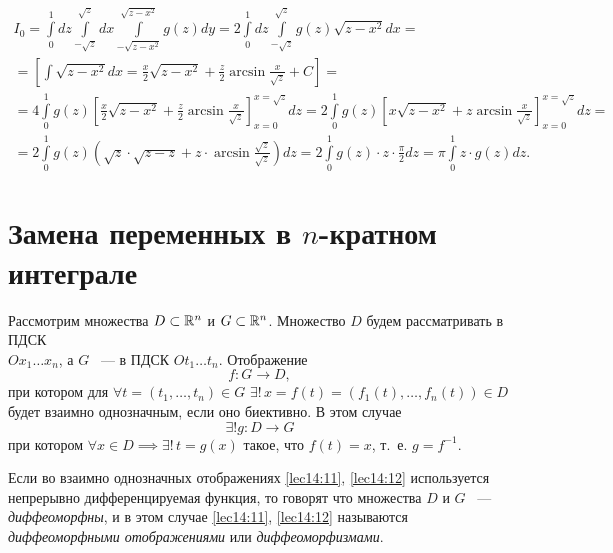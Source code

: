 \documentclass[../../main.tex]{subfiles}
\begin{document}
\begin{example}
		\[
		\begin{gathered}
		I_0 = 
		\int\limits_0^1dz\int\limits_{-\sqrt{z}}^{\sqrt{z}}dx\int\limits_{-\sqrt{z - 
		x^2}}^{\sqrt{z - x^2}}g\left(z\right)dy = 
		2\int\limits_0^1dz\int\limits_{-\sqrt{z}}^{\sqrt{z}}g\left(z\right)\sqrt{z - 
		x^2}dx = \\ =
		\left[\int\sqrt{z - x^2}dx = \frac{x}{2}\sqrt{z - x^2} + 
		\frac{z}{2}\arcsin{\frac{x}{\sqrt{z}}} + C\right] = \\ = 
		4 \int\limits_0^1 g\left(z\right) \left[ \frac{x}{2}\sqrt{z - x^2} + 
		\frac{z}{2}\arcsin{\frac{x}{\sqrt{z}}}\right]_{x=0}^{x=\sqrt{z}}dz= 2 
		\int\limits_0^1 g\left(z\right) \left[x\sqrt{z - x^2} + 
		z\arcsin{\frac{x}{\sqrt{z}}}\right]_{x=0}^{x=\sqrt{z}}dz = \\
		= 2 \int\limits_0^1 g\left(z\right) \left(\sqrt{z} \cdot \sqrt{z-z} + 
		z \cdot \arcsin{\frac{\sqrt{z}}{\sqrt{z}}}\right) dz = 2 \int\limits_0^1 
		g\left(z\right) \cdot z \cdot \frac{\pi}{2} dz = \pi \int\limits_0^1 z \cdot 
		g\left(z\right)dz. 
		\end{gathered}\]
	\end{example}

	\section{Замена переменных в $n$-кратном интеграле}
	
	Рассмотрим множества $D \subset \mathbb{R}^n$ и $G \subset \mathbb{R}^n$. Множество $D$ будем 
	рассматривать в ПДСК\\ $Ox_1 \ldots x_n$, а $G$ ~--- в ПДСК $Ot_1 \ldots t_n$.
	Отображение 
	\begin{equation}
	\label{lec14:11}
	f : G \to D,
	\end{equation} при котором 
	для $\forall t = \left( t_1, \ldots, t_n \right) \in G$ $\exists ! \,
	x = f\left(t\right) = \left(f_1\left( t\right) , \ldots, f_n\left( t\right)  
	\right)  \in D$
	будет взаимно однозначным, если оно биективно. В этом случае 
	\begin{equation}
	\label{lec14:12}
	\exists ! g :  D \to G
	\end{equation}
	при котором $\forall x \in D \implies  \exists!\, t = g\left( x\right) $ 
	такое, что 
	$f\left( t\right)  = x$, т.~е. $g = f^{-1}$.
	
	Если во взаимно однозначных отображениях \eqref{lec14:11}, \eqref{lec14:12}
	используется непрерывно дифференцируемая функция, то говорят что множества 
	$D$ и $G$ ~--- \emph{диффеоморфны}, и в этом случае 
	\eqref{lec14:11}, \eqref{lec14:12} называются \emph{диффеоморфными 
	отображениями}
	или \emph{диффеоморфизмами}.
	
\end{document}
